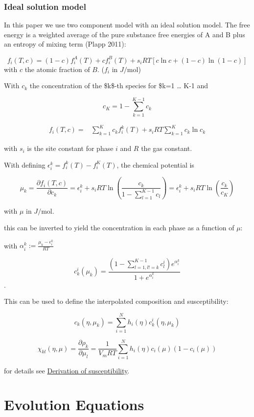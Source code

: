 \documentclass[11pt]{article}
\makeatletter
\newcommand{\citeprocitem}[2]{\hyper@linkstart{cite}{citeproc_bib_item_#1}#2\hyper@linkend}
\makeatother
\begin{document}
\subsubsection{Ideal solution model}
\label{sec:org41f6411}

In this paper we use two component model with an ideal solution model. The free energy is a weighted average of the pure substance free energies of A and B plus an entropy of mixing term (\citeprocitem{5}{Plapp 2011}):

$$
f_i(T,c) = (1-c) f_i^A(T) + c f_i^B(T) + s_i RT \left[ c \ln c + (1-c) \ln (1-c) \right]
$$
with \(c\) the atomic fraction of \(B\). (\(f_i\) in \(J/\text{mol}\))

With \(c_k\) the concentration of the \$k\$-th species for \$k=1 \dots{} K-1 and

$$
c_K = 1 - \sum_{k=1}^{K-1} c_k
$$

\begin{align*}
f_i(T,c) =& \sum_{k=1}^{K} c_k f_i^k(T) + s_i RT \sum_{k=1}^{K} c_k \ln c_k
\end{align*}

with \(s_i\) is the site constant for phase \(i\) and \(R\) the gas constant.

With defining \(\epsilon_i^k = f_i^k(T) - f_i^K(T)\), the chemical potential is


$$
\mu_k = \frac{\partial f_i(T,c)}{\partial c_k} = \epsilon_i^k + s_i R T \ln{\left(\frac{c_k}{1-\sum_{l=1}^{K-1} c_l}\right)} = \epsilon_i^k + s_i R T \ln{\left(\frac{c_k}{c_K}\right)}
$$

with \(\mu\) in \(J/\text{mol}\).

this can be inverted to yield the concentration in each phase as a function of \(\mu\):

with \(\alpha_i^k := \frac{\mu_k - \epsilon_i^k}{R T}\)

$$
c_k^i(\mu_k) = \frac{\left(1-\sum_{l=1, l != k}^{K-1} c_l^i \right) e^{\alpha_i^k}}{1 + e^{\alpha_i^k}}
$$.

This can be used to define the interpolated composition and susceptibility:

$$
c_k(\eta, \mu_k) = \sum_{i=1}^N h_i(\eta) c_k^i(\eta, \mu_k)
$$

$$
\chi_{kl}(\eta, \mu) = \frac{\partial \rho_k}{\partial \mu_l} = \frac{1}{V_m R T} \sum_{i=1}^N h_i(\eta) c_i(\mu) (1-c_i(\mu))
$$

for details see \hyperref[sec:orgc44efe4]{Derivation of susceptibility}.

\section{Evolution Equations}
\label{sec:org43d98ea}
\end{document}
